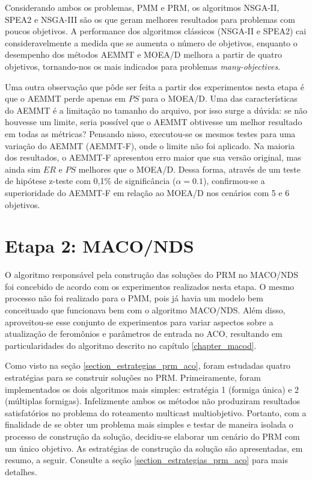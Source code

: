 Considerando ambos os problemas, PMM e PRM, os algoritmos NSGA-II, SPEA2 e NSGA-III são os que geram melhores resultados para problemas com poucos objetivos. A performance dos algoritmos clássicos (NSGA-II e SPEA2) cai consideravelmente a medida que se aumenta o número de objetivos, enquanto o desempenho dos métodos AEMMT e MOEA/D melhora a partir de quatro objetivos, tornando-nos os mais indicados para problemas \textit{many-objectives}.

Uma outra observação que pôde ser feita a partir dos experimentos nesta etapa é que o AEMMT perde apenas em $PS$ para o MOEA/D. Uma das características do AEMMT é a limitação no tamanho do arquivo, por isso surge a dúvida: se não houvesse um limite, seria possível que o AEMMT obtivesse um melhor resultado em todas as métricas? Pensando nisso, executou-se os mesmos testes para uma variação do AEMMT (AEMMT-F), onde o limite não foi aplicado. Na maioria dos resultados, o AEMMT-F apresentou erro maior que sua versão original, mas ainda sim $ER$ e $PS$ melhores que o MOEA/D. Dessa forma, através de um teste de hipótese z-teste com 0,1\% de significância ($\alpha = 0.1$), confirmou-se a superioridade do AEMMT-F em relação ao MOEA/D nos cenários com 5 e 6 objetivos.

\section{Etapa 2: MACO/NDS}
\label{section_experimentos_etapa2}

O algoritmo responsável pela construção das soluções do PRM no MACO/NDS foi concebido de acordo com os experimentos realizados nesta etapa. O mesmo processo não foi realizado para o PMM, pois já havia um modelo bem conceituado que funcionava bem com o algoritmo MACO/NDS. Além disso, aproveitou-se esse conjunto de experimentos para variar aspectos sobre a atualização de feromônios e parâmetros de entrada no ACO, resultando em particularidades do algoritmo descrito no capítulo \ref{chapter_macod}.

Como visto na seção \ref{section_estrategias_prm_aco}, foram estudadas quatro estratégias para se construir soluções no PRM. Primeiramente, foram implementados os dois algoritmos mais simples: estratégia 1 (formiga única) e 2 (múltiplas formigas). Infelizmente ambos os métodos não produziram resultados satisfatórios no problema do roteamento multicast multiobjetivo. Portanto, com a finalidade de se obter um problema mais simples e testar de maneira isolada o processo de construção da solução, decidiu-se elaborar um cenário do PRM com um único objetivo. As estratégias de construção da solução são apresentadas, em resumo, a seguir. Consulte a seção \ref{section_estrategias_prm_aco} para mais detalhes.

